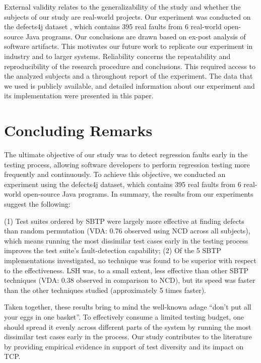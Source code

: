 \documentclass[runningheads]{llncs}
\begin{document}
External validity relates to the generalizability of the study and whether the subjects of our study are real-world projects. Our experiment was conducted on the defects4j dataset \cite{just2014defects4j}, which contains 395 real faults from 6 real-world open-source Java programs. Our conclusions are drawn based on ex-post analysis of software artifacts. This motivates our future work to replicate our experiment in industry and to larger systems. Reliability concerns the repeatability and reproducibility of the research procedure and conclusions. This required access to the analyzed subjects and a throughout report of the experiment. The data that we used is publicly available, and detailed information about our experiment and its implementation were presented in this paper.


\section{Concluding Remarks}


The ultimate objective of our study was to detect regression faults early in the testing process, allowing software developers to perform regression testing more frequently and continuously. To achieve this objective, we conducted an experiment using the defects4j dataset, which contains 395 real faults from 6 real-world open-source Java programs. In summary, the results from our experiments suggest the following: 

(1) Test suites ordered by SBTP were largely more effective at finding defects than random permutation (VDA: 0.76 observed using NCD across all subjects), which means running the most dissimilar test cases early in the testing process improves the test suite's fault-detection capability; (2) Of the 5 SBTP implementations investigated, no technique was found to be superior with respect to the effectiveness. LSH was, to a small extent, less effective than other SBTP techniques (VDA: 0.38 observed in comparison to NCD), but its speed was faster than the other techniques studied (approximately 5 times faster).

Taken together, these results bring to mind the well-known adage \enquote{don't put all your eggs in one basket}. To effectively consume a limited testing budget, one should spread it evenly across different parts of the system by running the most dissimilar test cases early in the process. Our study contributes to the literature by providing empirical evidence in support of test diversity and its impact on TCP.





%
%
%



\end{document}
